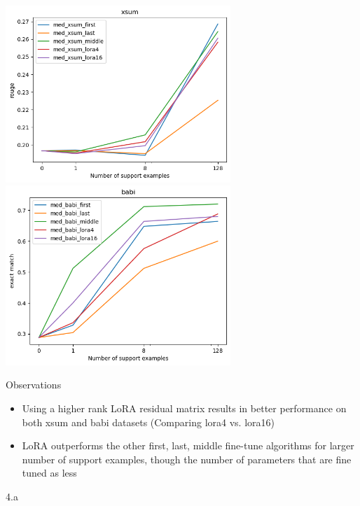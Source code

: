 \begin{answer}

\includegraphics[width=8.5cm]{figures/lora_ft_xsum_plot.png}
\includegraphics[width=8.5cm]{figures/lora_ft_babi_plot.png}

    Observations
    \begin{itemize}
        \item Using a higher rank LoRA residual matrix results in better performance on both xsum and babi datasets (Comparing lora4 vs. lora16)
        \item LoRA outperforms the other {first, last, middle} fine-tune algorithms for larger number of support examples, though the number of parameters that are fine tuned as less
    \end{itemize}
    
\end{answer}

\clearpage

\LARGE
4.a
\normalsize


